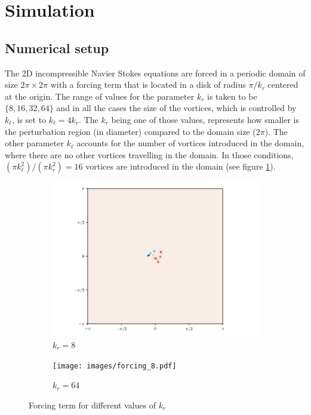 \documentclass[../main.tex]{subfiles}
\begin{document}
\section{Simulation}
\subsection{Numerical setup}\label{sec:numerical}
The 2D incompressible Navier Stokes equations are forced in a periodic domain of size $2\pi \times 2\pi$ with a forcing term that is located in a disk of radius $\pi/k_r$ centered at the origin. The range of values for the parameter $k_r$ is taken to be $\{8, 16, 32, 64\}$ and in all the cases the size of the vortices, which is controlled by $k_\ell$, is set to $k_\ell = 4 k_r$. The $k_r$ being one of those values, represents how smaller is the perturbation region (in diameter) compared to the domain size ($2\pi$). The other parameter $k_\ell$ accounts for the number of vortices introduced in the domain, where there are no other vortices travelling in the domain. In those conditions, $(\pi k_\ell^2)/(\pi k_r^2) = 16$ vortices are introduced in the domain (see figure \ref{fig:forcing}).

\begin{figure}[ht]
	\centering
	\begin{subfigure}{0.45\textwidth}
		\centering
		\includegraphics[width=\textwidth]{images/forcing32_8.pdf}
		\caption{$k_r = 8$}
	\end{subfigure}\hspace{0.033\textwidth}
	\begin{subfigure}{0.45\textwidth}
		\centering
		\texttt{[image: images/forcing\_8.pdf]}
		\caption{$k_r = 64$}
	\end{subfigure}
	\caption{Forcing term for different values of $k_r$}
	\label{fig:forcing}
\end{figure}
\end{document}
